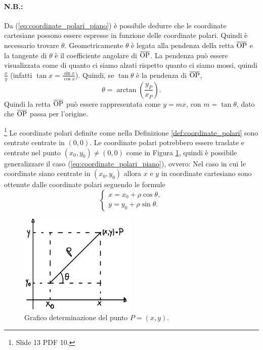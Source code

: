 \paragraph{N.B.:} Da (\ref{eq:coordinate_polari_piano}) è possibile dedurre che le coordinate cartesiane possono essere espresse in funzione delle coordinate polari. Quindi è necessario trovare $\theta$. Geometricamente $\theta$ è legata alla pendenza della retta $\overline{\rm OP}$ e la tangente di $\theta$ è il coefficiente angolare di $\overline{\rm OP}$. La pendenza può essere visualizzata come di quanto ci siamo alzati rispetto quanto ci siamo mossi, quindi $\frac{x}{y}$ (infatti $\tan x=\frac{\sin x}{\cos x}$). Quindi, se $\tan\theta$ è la pendenza di $\overline{\rm OP}$, 
\begin{equation*}
    \theta=\arctan\left(\frac{y_P}{x_P}\right).
\end{equation*}
Quindi la retta $\overline{\rm OP}$ può essere rappresentata come $y=mx$, con $m=\tan\theta$, dato che $\overline{\rm OP}$ passa per l'origine.

\begin{remark}\footnote{Slide 13 PDF 10.}
    Le coordinate polari definite come nella Definizione \ref{def:coordinate_polari} sono centrate centrate in $(0,0)$. Le coordinate polari potrebbero essere traslate e centrate nel punto $(x_0,y_0)\neq(0,0)$ come in Figura \ref{fig:piano_coordinate_polari_centrate_x0_y0}, quindi è possibile generalizzare il caso (\ref{eq:coordinate_polari_piano}), ovvero: Nel caso in cui le coordinate siano centrate in $(x_0,y_0)$ allora $x$ e $y$ in coordinate cartesiano sono ottenute dalle coordinate polari seguendo le formule
    \begin{equation*}
        \begin{cases}
            x=x_0+\rho\cos\theta,\\
            y=y_0+\rho\sin\theta.
        \end{cases}
    \end{equation*}
\end{remark}
\begin{figure}
    \centering
    \includegraphics[width=0.5\textwidth]{Analisi2/figures/piano_coordinate_polari_centrate_x0_y0.jpg}
    \caption{Grafico determinazione del punto $P=(x,y)$.}\label{fig:piano_coordinate_polari_centrate_x0_y0}
\end{figure}


